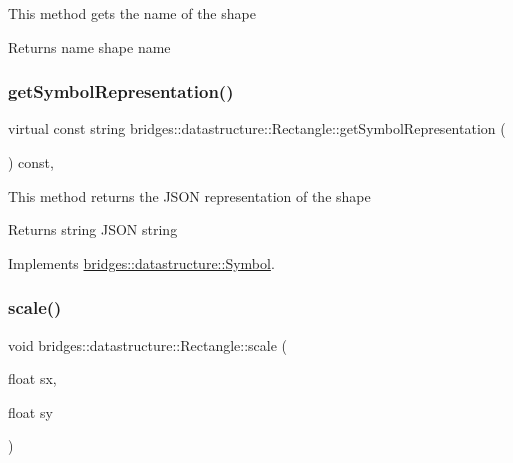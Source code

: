 This method gets the name of the shape

\begin{DoxyReturn}{Returns}
name shape name 
\end{DoxyReturn}
\mbox{\label{classbridges_1_1datastructure_1_1_rectangle_ada89ed40d2515a3518084f5460ba8dac}} 
\subsubsection{\texorpdfstring{get\+Symbol\+Representation()}{getSymbolRepresentation()}}
{\footnotesize\ttfamily virtual const string bridges\+::datastructure\+::\+Rectangle\+::get\+Symbol\+Representation (\begin{DoxyParamCaption}{ }\end{DoxyParamCaption}) const\hspace{0.3cm}{\ttfamily [inline]}, {\ttfamily [virtual]}}

This method returns the J\+S\+ON representation of the shape

\begin{DoxyReturn}{Returns}
string J\+S\+ON string 
\end{DoxyReturn}


Implements \hyperlink{classbridges_1_1datastructure_1_1_symbol_a8044b3da559dcd9de8510ae339f126c8}{bridges\+::datastructure\+::\+Symbol}.

\mbox{\label{classbridges_1_1datastructure_1_1_rectangle_ae17021407556e0d434b54a81d94614b3}} 
\subsubsection{\texorpdfstring{scale()}{scale()}}
{\footnotesize\ttfamily void bridges\+::datastructure\+::\+Rectangle\+::scale (\begin{DoxyParamCaption}\item[{float}]{sx,  }\item[{float}]{sy }\end{DoxyParamCaption})\hspace{0.3cm}{\ttfamily [inline]}}

